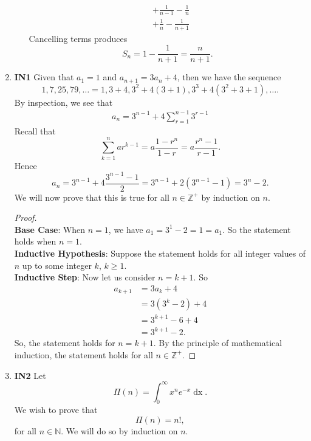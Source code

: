 \documentclass[12pt,oneside]{book}
\begin{document}
\begin{enumerate}
\begin{enumerate}
\begin{align*}
                    &+ \frac{1}{n-1} - \frac{1}{n} \\
                    &+ \frac{1}{n} - \frac{1}{n+1}
            \end{align*}
            Cancelling terms produces \[
                S_n = 1 - \frac{1}{n+1} = \frac{n}{n+1}
            .\] 
        \end{enumerate}
        \item \textbf{IN1} Given that $a_1 = 1$ and $a_{n +1} = 3 a_n + 4$, then we have the sequence \[
            1, 7, 25, 79, \ldots = 1, 3 + 4, 3^2 + 4(3 + 1), 3^3 + 4(3^2 + 3 + 1), \ldots
        .\]  By inspection, we see that \begin{align*}
            a_n = 3^{n - 1} + 4 \sum_{r=1}^{n-1} 3^{r-1}
        \end{align*}
        Recall that \[
            \sum_{k=1}^{n} ar^{k - 1} = a \frac{1 - r^n}{1 - r} = a \frac{r^n - 1}{r - 1}
        .\] Hence \[
            a_n = 3^{n - 1} + 4 \frac{3^{n-1}-1}{2} = 3^{n-1} + 2(3^{n-1} - 1) = 3^n - 2
        .\] We will now prove that this is true for all $n \in \mathbb{Z}^+$ by induction on $n$.
        \begin{proof} \hspace{1mm} \\
            \textbf{Base Case}: When $n = 1$, we have $a_1 = 3^1 - 2 = 1 = a_1$. So the statement holds when $n = 1$. \\
            \textbf{Inductive Hypothesis}: Suppose the statement holds for all integer values of $n$ up to some integer $k$, $k \geq 1$. \\
            \textbf{Inductive Step}: Now let us consider $n = k + 1$. So \begin{align*}
                a_{k+1} &= 3 a_k + 4 \\
                &= 3 \left( 3^k - 2 \right) + 4\\
                &= 3^{k+1} - 6 + 4 \\
                &= 3^{k + 1} - 2.
            \end{align*} 
            So, the statement holds for $n = k + 1$. By the principle of mathematical induction, the statement holds for all $n \in \mathbb{Z}^+$.
        \end{proof}
        \item \textbf{IN2} Let \[
            \Pi(n) = \int_{0}^{\infty} x^n e^{-x} \mathop{\mathrm{d}x}   
        .\] We wish to prove that \[
            \Pi(n) = n!
        ,\] for all $n \in \mathbb{N}$. We will do so by induction on $n$. 

\end{enumerate}
\end{document}
